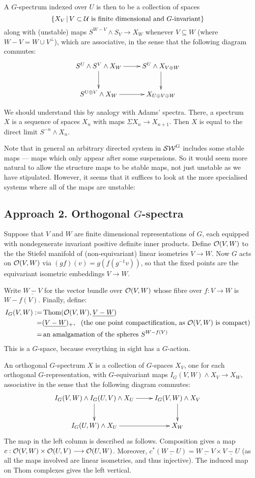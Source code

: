 \documentclass[11pt]{article}
\begin{document}
\begin{defn*}
A $G$-spectrum indexed over $U$ is then to be a collection of spaces 
\[\{X_V\,|\,V\subset\mathcal{U}\text{ is finite dimensional and $G$-invariant}\}\]
along with (unstable) maps $S^{W-V}\wedge S_V\to X_W$ whenever $V\subseteq W$ (where $W-V=W\cup V^\perp$), which are associative, in the sense that the following diagram commutes:
\[\xymatrix{
\ar[d]S^U\wedge S^V\wedge X_W\ar[r]&S^U\wedge X_{V\oplus W}\ar[d]\\
S^{U\oplus V}\wedge X_W\ar[r]&X_{U\oplus V\oplus W}
}\]
\end{defn*}
We should understand this by analogy with Adams' spectra. There, a spectrum $X$ is a sequence of spaces $X_n$ with maps $\Sigma X_n\to X_{n+1}$. Then $X$ is equal to the direct limit $S^{-n}\wedge X_n$.

Note that in general an arbitrary directed system in $\operatorname{{\mathcal{SW}^G}}$ includes some stable maps --- maps which only appear after some suspensions. So it would seem more natural to allow the structure maps to be stable maps, not just unstable as we have stipulated. However, it seems that it suffices to look at the more specialised systems where all of the maps are unstable:
\subsection*{Approach 2. Orthogonal $G$-spectra}
Suppose that $V$ and $W$ are finite dimensional representations of $G$, each equipped with nondegenerate invariant positive definite inner products. Define $\mathcal{O}(V,W)$ to the the Stiefel manifold of (non-equivariant) linear isometries $V\to W$. Now $G$ acts on $\mathcal{O}(V,W)$ via $(gf)(v)=g(f(g^{-1}v))$, so that the fixed points are the equivariant isometric embeddings $V\to W$.

Write $\underline{W-V}$ for the vector bundle over $\mathcal{O}(V,W)$ whose fibre over $f:V\to W$ is $W-f(V)$. Finally, define:
\begin{alignat*}{2}
I_G(V,W):=&\textup{\,Thom}(\mathcal{O}(V,W),\underline{V-W})\\
=&(\underline{V-W})_+,\text{ \ (the one point compactification, as $\mathcal{O}(V,W)$ is compact)}\\
=&\text{\,an amalgamation of the spheres $S^{W-f(V)}$}
\end{alignat*}
This is a $G$-space, because everything in sight has a $G$-action.
\begin{defn*}
An orthogonal $G$-spectrum $X$ is a collection of $G$-spaces $X_V$, one for each orthogonal $G$-representation, with $G$-equivariant maps $I_G(V,W)\wedge X_V\to X_W$, associative in the sense that the following diagram commutes:
\[\xymatrix{
\ar[d]I_G(V,W)\wedge I_G(U,V)\wedge X_U\ar[r]&I_G(V,W)\wedge X_{V}\ar[d]\\
I_G(U,W)\wedge X_U\ar[r]&X_{W}
}\]
The map in the left column is described as follows. Composition gives a map $c:\mathcal{O}(V,W)\times\mathcal{O}(U,V)\longrightarrow\mathcal{O}(U,W)$. Moreover, $c^*(\underline{W-U})=\underline{W-V}\times\underline{V-U}$ (as all the maps involved are linear isometries, and thus injective). The induced map on Thom complexes gives the left vertical.
\end{defn*}
\end{document}
